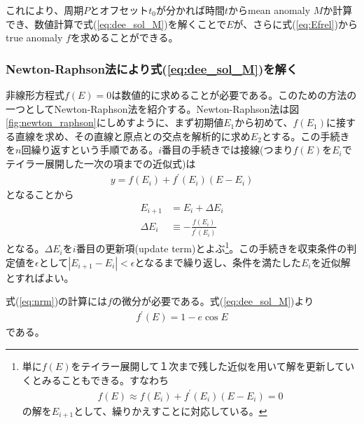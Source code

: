 これにより、周期$P$とオフセット$t_0$が分かれば時間$t$からmean anomaly $M$か計算でき、数値計算で式(\ref{eq:dee_sol_M})を解くことで$E$が、さらに式(\ref{eq:Efrel})からtrue anomaly $f$を求めることができる。\\

\subsubsection{Newton-Raphson法により式(\ref{eq:dee_sol_M})を解く}

非線形方程式$f(E)=0$は数値的に求めることが必要である。このための方法の一つとしてNewton-Raphson法を紹介する。Newton-Raphson法は図\ref{fig:newton_raphson}にしめすように、まず初期値$E_1$から初めて、$f(E_1)$に接する直線を求め、その直線と原点との交点を解析的に求め$E_2$とする。この手続きを$n$回繰り返すという手順である。$i$番目の手続きでは接線(つまり$f(E)$を$E_i$でテイラー展開した一次の項までの近似式)は
\begin{align}
\label{eq:nrm}
   y = f(E_i) + f^\prime(E_i) (E - E_i) 
\end{align}
となることから
\begin{align}
\label{eq:update_newton}
    E_{i+1} &= E_i + \Delta E_i \\
    \Delta E_i &\equiv - \frac{f(E_i)}{f^\prime(E_i)}
\end{align}
となる。$\Delta E_i$を$i$番目の更新項(update term)とよぶ\footnote{単に$f(E)$をテイラー展開して１次まで残した近似を用いて解を更新していくとみることもできる。すなわち
\begin{align}
\label{eq:nrm_f}
   f(E) \approx f(E_i) + f^\prime(E_i) (E - E_i) = 0
\end{align}
の解を$E_{i+1}$として、繰りかえすことに対応している。}。この手続きを収束条件の判定値を$\epsilon$として$ |E_{i+1} - E_{i}| < \epsilon$となるまで繰り返し、条件を満たした$E_i$を近似解とすればよい。

式(\ref{eq:nrm})の計算には$f$の微分が必要である。式(\ref{eq:dee_sol_M})より
\begin{align}
    f^\prime(E) = 1 - e \cos{E}
\end{align}
である。


